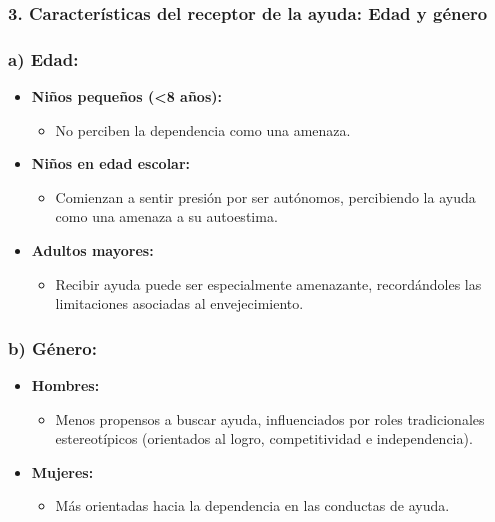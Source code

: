 \documentclass[
]{book}
\providecommand{\tightlist}{%
  \setlength{\itemsep}{0pt}\setlength{\parskip}{0pt}}
\begin{document}
\subsubsection{\texorpdfstring{3. \textbf{Características del receptor de la ayuda: Edad y género}}{3. Características del receptor de la ayuda: Edad y género}}\label{caracteruxedsticas-del-receptor-de-la-ayuda-edad-y-guxe9nero}

\subsubsection{\texorpdfstring{\textbf{a) Edad:}}{a) Edad:}}\label{a-edad}

\begin{itemize}
\tightlist
\item
  \textbf{Niños pequeños (\textless8 años):}

  \begin{itemize}
  \tightlist
  \item
    No perciben la dependencia como una amenaza.
  \end{itemize}
\item
  \textbf{Niños en edad escolar:}

  \begin{itemize}
  \tightlist
  \item
    Comienzan a sentir presión por ser autónomos, percibiendo la ayuda como una amenaza a su autoestima.
  \end{itemize}
\item
  \textbf{Adultos mayores:}

  \begin{itemize}
  \tightlist
  \item
    Recibir ayuda puede ser especialmente amenazante, recordándoles las limitaciones asociadas al envejecimiento.
  \end{itemize}
\end{itemize}

\subsubsection{\texorpdfstring{\textbf{b) Género:}}{b) Género:}}\label{b-guxe9nero}

\begin{itemize}
\tightlist
\item
  \textbf{Hombres:}

  \begin{itemize}
  \tightlist
  \item
    Menos propensos a buscar ayuda, influenciados por roles tradicionales estereotípicos (orientados al logro, competitividad e independencia).
  \end{itemize}
\item
  \textbf{Mujeres:}

  \begin{itemize}
  \tightlist
  \item
    Más orientadas hacia la dependencia en las conductas de ayuda.
  \end{itemize}
\end{itemize}
\end{document}
